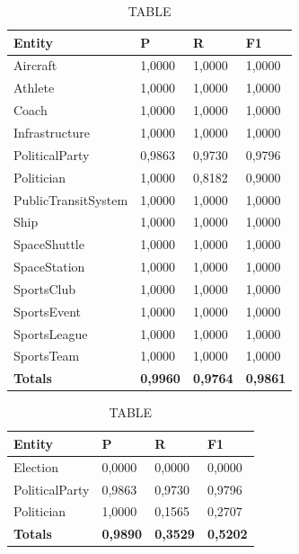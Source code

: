 \documentclass[thesis=M,english]{FITthesis}[2018/05/30]
\begin{document}
	\begin{table}[H]\centering
		\caption{TABLE}
		\label{}
		\begin{tabular}{|l|l|l|l|}
			\hline {\textbf{Entity}} & {\textbf{P}} & {\textbf{R}} & {\textbf{F1}}\\\hline
				Aircraft & 1,0000 & 1,0000 & 1,0000\\
				Athlete & 1,0000 & 1,0000 & 1,0000\\
				Coach & 1,0000 & 1,0000 & 1,0000\\
				Infrastructure & 1,0000 & 1,0000 & 1,0000\\
				PoliticalParty & 0,9863 & 0,9730 & 0,9796\\
				Politician & 1,0000 & 0,8182 & 0,9000\\
				PublicTransitSystem & 1,0000 & 1,0000 & 1,0000\\
				Ship & 1,0000 & 1,0000 & 1,0000\\
				SpaceShuttle & 1,0000 & 1,0000 & 1,0000\\
				SpaceStation & 1,0000 & 1,0000 & 1,0000\\ 
				SportsClub & 1,0000 & 1,0000 & 1,0000\\
				SportsEvent & 1,0000 & 1,0000 & 1,0000\\
				SportsLeague & 1,0000 & 1,0000 & 1,0000\\
				SportsTeam & 1,0000 & 1,0000 & 1,0000\\\hline
				\textbf{Totals} & \textbf{0,9960} & \textbf{0,9764} & \textbf{0,9861}\\\hline
		\end{tabular}
	\end{table}

	\begin{table}[H]\centering
		\caption{TABLE}
		\label{}
		\begin{tabular}{|l|l|l|l|}
			\hline {\textbf{Entity}} & {\textbf{P}} & {\textbf{R}} & {\textbf{F1}}\\\hline
				Election & 0,0000 & 0,0000 & 0,0000\\
				PoliticalParty & 0,9863 & 0,9730 & 0,9796\\
				Politician & 1,0000 & 0,1565 & 0,2707\\\hline
				\textbf{Totals} & \textbf{0,9890} & \textbf{0,3529} & \textbf{0,5202}\\\hline
		\end{tabular}
	\end{table}	
\end{document}
